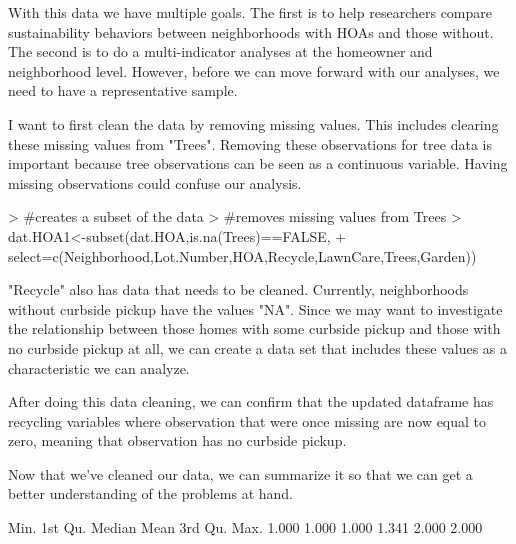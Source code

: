 \documentclass{article}
\begin{document}
With this data we have multiple goals. The first is to help researchers compare sustainability behaviors between neighborhoods with HOAs and those without. The second is to do a multi-indicator analyses at the homeowner and neighborhood level. However, before we can move forward with our analyses, we need to have a representative sample.


I want to first clean the data by removing missing values. This includes clearing these missing values from "Trees". Removing these observations for tree data is important because tree observations can be seen as a continuous variable. Having missing observations could confuse our analysis.


\begin{Schunk}
\begin{Sinput}
> #creates a subset of the data
> #removes missing values from Trees
> dat.HOA1<-subset(dat.HOA,is.na(Trees)==FALSE,
+                  select=c(Neighborhood,Lot.Number,HOA,Recycle,LawnCare,Trees,Garden)) 
\end{Sinput}
\end{Schunk}


"Recycle" also has data that needs to be cleaned. Currently, neighborhoods without curbside pickup have the values "NA". Since we may want to investigate the relationship between those homes with some curbside pickup and those with no curbside pickup at all, we can create a data set that includes these values as a characteristic we can analyze. 


\begin{Schunk}
\end{Schunk}


After doing this data cleaning, we can confirm that the updated dataframe has recycling variables where observation that were once missing are now equal to zero, meaning that observation has no curbside pickup.


Now that we've cleaned our data, we can summarize it so that we can get a better understanding of the problems at hand.


\begin{Schunk}
\begin{Soutput}
   Min. 1st Qu.  Median    Mean 3rd Qu.    Max. 
  1.000   1.000   1.000   1.341   2.000   2.000 
\end{Soutput}
\end{Schunk}
\end{document}
